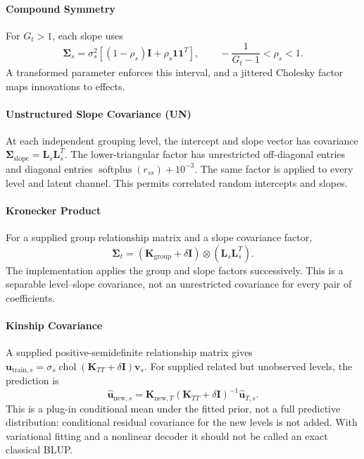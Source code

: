 \documentclass[12pt,a4paper]{article}
\begin{document}
\paragraph{Compound Symmetry}
For $G_t>1$, each slope uses
\begin{equation}
 \mathbf\Sigma_s=\sigma_s^2[(1-\rho_s)\mathbf I+\rho_s\mathbf1\mathbf1^T],
 \qquad -\frac{1}{G_t-1}<\rho_s<1.
\end{equation}
A transformed parameter enforces this interval, and a jittered Cholesky factor maps innovations to effects.

\paragraph{Unstructured Slope Covariance (UN)}
At each independent grouping level, the intercept and slope vector has covariance
$\mathbf\Sigma_{\mathrm{slope}}=\mathbf L_s\mathbf L_s^T$.
The lower-triangular factor has unrestricted off-diagonal entries and diagonal entries $\operatorname{softplus}(r_{ss})+10^{-3}$. The same factor is applied to every level and latent channel. This permits correlated random intercepts and slopes.

\paragraph{Kronecker Product}
For a supplied group relationship matrix and a slope covariance factor,
\begin{equation}
 \mathbf\Sigma_t=(\mathbf K_{\mathrm{group}}+\delta\mathbf I)
                    \otimes(\mathbf L_s\mathbf L_s^T).
\end{equation}
The implementation applies the group and slope factors successively. This is a separable level--slope covariance, not an unrestricted covariance for every pair of coefficients.

\paragraph{Kinship Covariance}
A supplied positive-semidefinite relationship matrix gives
$\mathbf u_{\mathrm{train},s}=\sigma_s\operatorname{chol}(\mathbf K_{TT}+\delta\mathbf I)\mathbf v_s$.
For supplied related but unobserved levels, the prediction is
\begin{equation}
 \widehat{\mathbf u}_{\mathrm{new},s}
 =\mathbf K_{\mathrm{new},T}(\mathbf K_{TT}+\delta\mathbf I)^{-1}
   \widehat{\mathbf u}_{T,s}.
\end{equation}
This is a plug-in conditional mean under the fitted prior, not a full predictive distribution: conditional residual covariance for the new levels is not added. With variational fitting and a nonlinear decoder it should not be called an exact classical BLUP.
\end{document}
